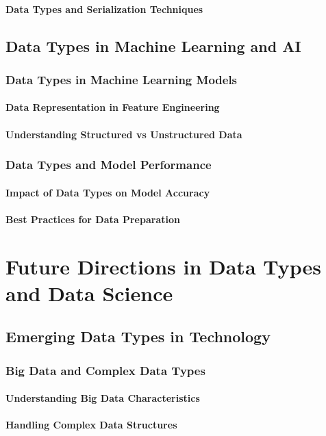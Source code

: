 \documentclass[12pt, oneside]{book}
\begin{document}
\subsubsection{Data Types and Serialization Techniques}
\section{Data Types in Machine Learning and AI}
\subsection{Data Types in Machine Learning Models}
\subsubsection{Data Representation in Feature Engineering}
\subsubsection{Understanding Structured vs Unstructured Data}
\subsection{Data Types and Model Performance}
\subsubsection{Impact of Data Types on Model Accuracy}
\subsubsection{Best Practices for Data Preparation}

\chapter{Future Directions in Data Types and Data Science}
\section{Emerging Data Types in Technology}
\subsection{Big Data and Complex Data Types}
\subsubsection{Understanding Big Data Characteristics}
\subsubsection{Handling Complex Data Structures}
\end{document}
